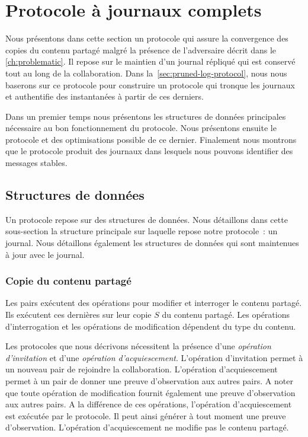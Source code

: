 \section{Protocole à journaux complets}\label{sec:full-log-protocol}

Nous présentons dans cette section un protocole qui assure la convergence des copies du contenu partagé malgré la présence de l'adversaire décrit dans le \autoref{ch:problematic}.
Il repose sur le maintien d'un journal répliqué qui est conservé tout au long de la collaboration.
Dans la~\autoref{sec:pruned-log-protocol}, nous nous baserons sur ce protocole pour construire un protocole qui tronque les journaux et authentifie des instantanées à partir de ces derniers.

Dans un premier temps nous présentons les structures de données principales nécessaire au bon fonctionnement du protocole.
Nous présentons ensuite le protocole et des optimisations possible de ce dernier.
Finalement nous montrons que le protocole produit des journaux dans lesquels nous pouvons identifier des messages stables.


\subsection{Structures de données}

Un protocole repose sur des structures de données.
Nous détaillons dans cette sous-section la structure principale sur laquelle repose notre protocole~: un journal.
Nous détaillons également les structures de données qui sont maintenues à jour avec le journal.

\subsubsection{Copie du contenu partagé}

Les pairs exécutent des opérations pour modifier et interroger le contenu partagé.
Ils exécutent ces dernières sur leur copie $S$ du contenu partagé.
Les opérations d'interrogation et les opérations de modification dépendent du type du contenu.

Les protocoles que nous décrivons nécessitent la présence d'une \emph{opération d'invitation} et d'une \emph{opération d'acquiescement}.
L'opération d'invitation permet à un nouveau pair de rejoindre la collaboration.
L'opération d'acquiescement permet à un pair de donner une preuve d'observation aux autres pairs.
A noter que toute opération de modification fournit également une preuve d'observation aux autres pairs.
A la différence de ces opérations, l'opération d'acquiescement est exécutée par le protocole.
Il peut ainsi générer à tout moment une preuve d'observation.
L'opération d'acquiescement ne modifie pas le contenu partagé.

